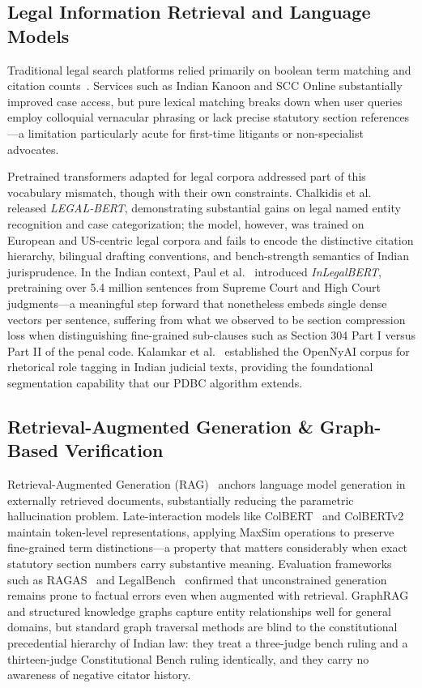 \documentclass[conference]{IEEEtran}
\begin{document}
\subsection{Legal Information Retrieval and Language Models}
Traditional legal search platforms relied primarily on boolean term matching and citation counts~\cite{katz2012rethinking}. Services such as Indian Kanoon and SCC Online substantially improved case access, but pure lexical matching breaks down when user queries employ colloquial vernacular phrasing or lack precise statutory section references---a limitation particularly acute for first-time litigants or non-specialist advocates.

Pretrained transformers adapted for legal corpora addressed part of this vocabulary mismatch, though with their own constraints. Chalkidis et al.~\cite{chalkidis2020legal} released \textit{LEGAL-BERT}, demonstrating substantial gains on legal named entity recognition and case categorization; the model, however, was trained on European and US-centric legal corpora and fails to encode the distinctive citation hierarchy, bilingual drafting conventions, and bench-strength semantics of Indian jurisprudence. In the Indian context, Paul et al.~\cite{paul2022pre} introduced \textit{InLegalBERT}, pretraining over 5.4 million sentences from Supreme Court and High Court judgments---a meaningful step forward that nonetheless embeds single dense vectors per sentence, suffering from what we observed to be section compression loss when distinguishing fine-grained sub-clauses such as Section 304 Part I versus Part II of the penal code. Kalamkar et al.~\cite{kalamkar2022corpus} established the OpenNyAI corpus for rhetorical role tagging in Indian judicial texts, providing the foundational segmentation capability that our PDBC algorithm extends.

\subsection{Retrieval-Augmented Generation \& Graph-Based Verification}
Retrieval-Augmented Generation (RAG)~\cite{lewis2020retrieval} anchors language model generation in externally retrieved documents, substantially reducing the parametric hallucination problem. Late-interaction models like ColBERT~\cite{khattab2020colbert} and ColBERTv2~\cite{santhanam2022colbertv2} maintain token-level representations, applying MaxSim operations to preserve fine-grained term distinctions---a property that matters considerably when exact statutory section numbers carry substantive meaning. Evaluation frameworks such as RAGAS~\cite{es2024ragas} and LegalBench~\cite{guha2023legalbench} confirmed that unconstrained generation remains prone to factual errors even when augmented with retrieval. GraphRAG~\cite{edge2024graphrag} and structured knowledge graphs capture entity relationships well for general domains, but standard graph traversal methods are blind to the constitutional precedential hierarchy of Indian law: they treat a three-judge bench ruling and a thirteen-judge Constitutional Bench ruling identically, and they carry no awareness of negative citator history.
\end{document}
